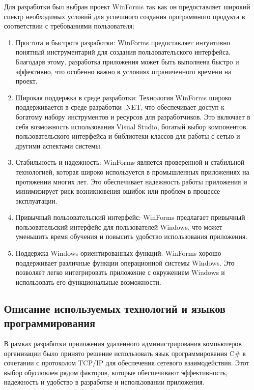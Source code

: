 Для разработки был выбран проект WinForms так как он предоставляет широкий спектр необходимых условий для успешного создания программного продукта в соответствии с требованиями пользователя:
\begin{enumerate}
	\item Простота и быстрота разработки: WinForms предоставляет интуитивно понятный инструментарий для создания пользовательского интерфейса. Благодаря этому, разработка приложения может быть выполнена быстро и эффективно, что особенно важно в условиях ограниченного времени на проект.

	\item Широкая поддержка в среде разработки: Технология WinForms широко поддерживается в среде разработки .NET, что обеспечивает доступ к богатому набору инструментов и ресурсов для разработчиков. Это включает в себя возможность использования Visual Studio, богатый выбор компонентов пользовательского интерфейса и библиотеки классов для работы с сетью и другими аспектами системы.

	\item Стабильность и надежность: WinForms является проверенной и стабильной технологией, которая широко используется в промышленных приложениях на протяжении многих лет. Это обеспечивает надежность работы приложения и минимизирует риск возникновения ошибок или проблем в процессе эксплуатации.

	\item Привычный пользовательский интерфейс: WinForms предлагает привычный пользовательский интерфейс для пользователей Windows, что может уменьшить время обучения и повысить удобство использования приложения.

	\item Поддержка Windows-ориентированных функций: WinForms хорошо поддерживает различные функции операционной системы Windows. Это позволяет легко интегрировать приложение с окружением Windows и использовать его функциональные возможности.
\end{enumerate}

\subsection{Описание используемых технологий и языков программирования}

В рамках разработки приложения удаленного администрирования компьютеров организации было принято решение использовать язык программирования C\# в сочетании с протоколом TCP/IP для обеспечения сетевого взаимодействия. Этот выбор обусловлен рядом факторов, которые обеспечивают эффективность, надежность и удобство в разработке и использовании приложения.

